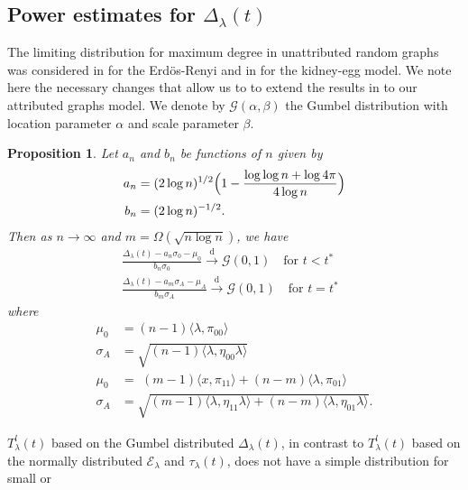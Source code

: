 \documentclass[10pt,journal,compsoc]{IEEEtran}
\newtheorem{proposition}[theorem]{Proposition}
\theoremstyle{definition}
\begin{document}
\subsection{Power estimates for $\Delta_{\lambda}(t)$}
\label{sec:power-estim-delt}
The limiting distribution for maximum degree in unattributed random
graphs was considered in \cite{bollobas85:_random_graph} for the
Erd\"{o}s-Renyi and in \cite{rukhin11} for the kidney-egg model. We
note here the necessary changes that allow us to to extend the results
in \cite{bollobas85:_random_graph,rukhin11} to our attributed graphs
model. We denote by $\mathcal{G}(\alpha,\beta)$ the Gumbel
distribution with location parameter $\alpha$ and scale parameter
$\beta$.
\begin{proposition}
  \label{prop:3}
  Let $a_n$ and $b_n$ be functions of $n$ given by
  \begin{align*}
    a_n &= (2 \log{n})^{1/2}\Bigl(1 - \frac{\log{\log{n}} + \log{4\pi}}{4 \log{n}} \Bigr) \\ 
    b_n &= (2 \log{n})^{-1/2}.
  \end{align*}
  Then as $n \rightarrow \infty$ and $m = \Omega( \sqrt{n \log{n}})$,
  we have
  \begin{gather}
    \label{eq:14}
    \frac{\Delta_{\lambda}(t) - a_{n} \sigma_0 - \mu_0}{b_n \sigma_0}
   \overset{\mathrm{d}}{\longrightarrow}  \mathcal{G}(0,1) \quad \text{for $t < t^{*}$ } \\
    \frac{\Delta_{\lambda}(t) - a_{m} \sigma_A - \mu_A}{b_m \sigma_A}
       \overset{\mathrm{d}}{\longrightarrow}\mathcal{G}(0,1) \quad \text{for $t = t^{*}$ }
  \end{gather}
  where
  \begin{align*}
    \mu_0 &= (n-1)\langle \lambda, \pi_{00} \rangle \\
    \sigma_A &= \sqrt{(n-1)\langle \lambda, \eta_{00} \lambda \rangle} \\
    \mu_0 &= \,\, (m - 1) \langle x, \pi_{11} \rangle + (n-
    m)\langle \lambda, \pi_{01} \rangle
    \\ \sigma_A &= \sqrt{ (m - 1) \langle \lambda, \eta_{11} \lambda \rangle + (n -
      m) \langle \lambda, \eta_{01} \lambda \rangle}.
    \end{align*}
\end{proposition}
$T_{\lambda}^{l}(t)$ based on the Gumbel distributed
$\Delta_{\lambda}(t)$, in contrast to $T_{\lambda}^{l}(t)$ based on
the normally distributed $\mathcal{E}_{\lambda}$ and
$\tau_{\lambda}(t)$, does not have a simple distribution for small or
\end{document}
